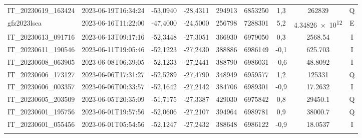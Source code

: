 \begin{center}
\begin{longtable}{lcccccccc}
IT\_20230619\_163424 & 2023-06-19T16:34:24 & -53,0940 & -28,4311 & 294913 & 6853250 & 1,3 & \num[round-precision=3,round-mode=figures,scientific-notation=true]{262839} & Q \\
gfz2023lsea & 2023-06-16T11:22:00 & -47,4000 & -24,5000 & 256798 & 7288301 & 5,2 & \num[round-precision=3,round-mode=figures,scientific-notation=true]{4.34826e+12} & E \\
IT\_20230613\_091716 & 2023-06-13T09:17:16 & -52,3448 & -27,3051 & 366930 & 6979050 & 0,3 & \num[round-precision=3,round-mode=figures,scientific-notation=true]{2568.54} & I \\
IT\_20230611\_190546 & 2023-06-11T19:05:46 & -52,1223 & -27,2430 & 388886 & 6986149 & -0,1 & \num[round-precision=3,round-mode=figures,scientific-notation=true]{625.703} & I \\
IT\_20230608\_063905 & 2023-06-08T06:39:05 & -52,1233 & -27,2441 & 388790 & 6986031 & -0,6 & \num[round-precision=3,round-mode=figures,scientific-notation=true]{48.8092} & I \\
IT\_20230606\_173127 & 2023-06-06T17:31:27 & -52,5289 & -27,4790 & 348949 & 6959577 & 1,2 & \num[round-precision=3,round-mode=figures,scientific-notation=true]{125331} & Q \\
IT\_20230606\_003357 & 2023-06-06T00:33:57 & -52,1642 & -27,2142 & 384706 & 6989301 & -0,9 & \num[round-precision=3,round-mode=figures,scientific-notation=true]{17.2632} & I \\
IT\_20230605\_203509 & 2023-06-05T20:35:09 & -51,7175 & -27,3387 & 429030 & 6975842 & 0,8 & \num[round-precision=3,round-mode=figures,scientific-notation=true]{29450.1} & Q \\
IT\_20230601\_195756 & 2023-06-01T19:57:56 & -52,0606 & -27,2107 & 394964 & 6989781 & 0,9 & \num[round-precision=3,round-mode=figures,scientific-notation=true]{38000.7} & Q \\
IT\_20230601\_055456 & 2023-06-01T05:54:56 & -52,1247 & -27,2432 & 388648 & 6986122 & -0,9 & \num[round-precision=3,round-mode=figures,scientific-notation=true]{18.0537} & I \\



\label{tab:dados_terremoto}
\end{longtable}
\end{center}
